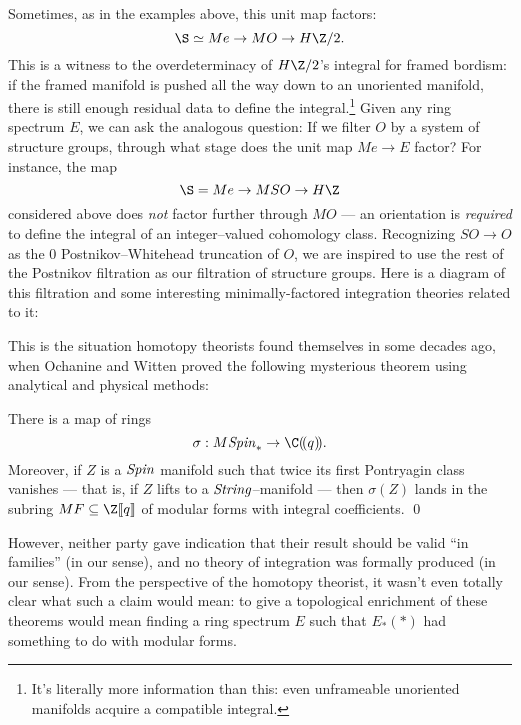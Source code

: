 Sometimes, as in the examples above, this unit map factors: \[\S \simeq Me \to MO \to H\Z/2.\]  This is a witness to the overdeterminacy of $H\Z/2$'s integral for framed bordism: if the framed manifold is pushed all the way down to an unoriented manifold, there is still enough residual data to define the integral.\footnote{It's literally more information than this: even unframeable unoriented manifolds acquire a compatible integral.}  Given any ring spectrum $E$, we can ask the analogous question: If we filter $O$ by a system of structure groups, through what stage does the unit map $Me \to E$ factor?  For instance, the map \[\S = Me \to MSO \to H\Z\] considered above does \emph{not} factor further through $MO$ --- an orientation is \emph{required} to define the integral of an integer--valued cohomology class.  Recognizing $SO \to O$ as the $0${\th} Postnikov--Whitehead truncation of $O$, we are inspired to use the rest of the Postnikov filtration as our filtration of structure groups.  Here is a diagram of this filtration and some interesting minimally-factored integration theories related to it:
\begin{center}
\end{center}

This is the situation homotopy theorists found themselves in some decades ago, when Ochanine and Witten proved the following mysterious theorem using analytical and physical methods:

\begin{theorem}\label{OchanineWittenTheorem}
There is a map of rings \[\sigma: M\Spin_* \to \C(\!(q)\!).\]  Moreover, if $Z$ is a $\mathit{Spin}$ manifold such that twice its first Pontryagin class vanishes --- that is, if $Z$ lifts to a $\mathit{String}$--manifold --- then $\sigma(Z)$ lands in the subring $MF \subseteq \Z\ps{q}$ of modular forms with integral coefficients. \qed
\end{theorem}

\noindent However, neither party gave indication that their result should be valid ``in families'' (in our sense), and no theory of integration was formally produced (in our sense).  From the perspective of the homotopy theorist, it wasn't even totally clear what such a claim would mean: to give a topological enrichment of these theorems would mean finding a ring spectrum $E$ such that $E_*(*)$ had something to do with modular forms.

